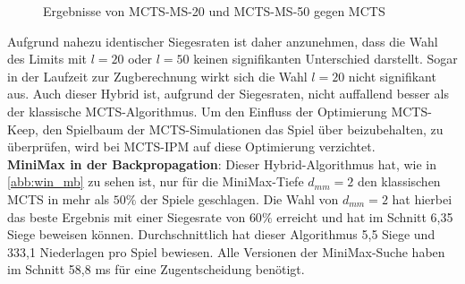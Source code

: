 \documentclass[12pt,a4paper,bibliography=totocnumbered,listof=totocnumbered]{article}
\begin{document}
\begin{figure} [h]
\centering
\begin{minipage}[t]{0.4\textwidth}
\centering
{}
\label{abb:ms-win}
\end{minipage}
\qquad
\begin{minipage}[t]{0.4\textwidth}
\centering
{}
\label{abb:ms-zeit}
\end{minipage}
\caption{Ergebnisse von MCTS-MS-20 und MCTS-MS-50 gegen MCTS}
\label{abb:ms-erg}
\end{figure}
Aufgrund nahezu identischer Siegesraten ist daher anzunehmen, dass die Wahl des Limits mit $l=20$ oder $l=50$ keinen signifikanten Unterschied darstellt. Sogar in der Laufzeit zur Zugberechnung wirkt sich die Wahl $l=20$ nicht signifikant aus. Auch dieser Hybrid ist, aufgrund der Siegesraten, nicht auffallend besser als der klassische MCTS-Algorithmus. Um den Einfluss der Optimierung MCTS-Keep, den Spielbaum der MCTS-Simulationen das Spiel über beizubehalten, zu überprüfen, wird bei MCTS-IPM auf diese Optimierung verzichtet.\\
\textbf{MiniMax in der Backpropagation}: Dieser Hybrid-Algorithmus hat, wie in \autoref{abb:win_mb} zu sehen ist, nur für die MiniMax-Tiefe $d_{mm} = 2$ den klassischen MCTS in mehr als $50\%$ der Spiele geschlagen. Die Wahl von $d_{mm} = 2$ hat hierbei das beste Ergebnis mit einer Siegesrate von $60\%$ erreicht und hat im Schnitt 6,35 Siege beweisen können. Durchschnittlich hat dieser Algorithmus 5,5 Siege und 333,1 Niederlagen pro Spiel bewiesen. Alle Versionen der MiniMax-Suche haben im Schnitt 58,8 ms für eine Zugentscheidung benötigt.
\end{document}
